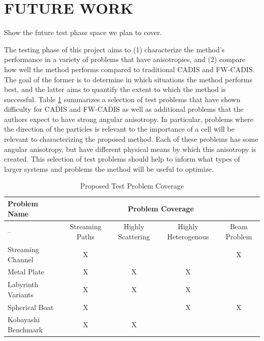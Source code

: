 \documentclass[12pt]{article}
\begin{document}
%
\section{FUTURE WORK} 
\label{sect::future}

Show the future test phase space we plan to cover. 

The testing phase of this project aims to (1) characterize the method's performance in a variety of problems that have anisotropies, and (2) compare how well the method performs compared to traditional CADIS and FW-CADIS.
The goal of the former is to determine in which situations the method performs best, and the latter aims to quantify the extent to which the method is successful. 
Table \ref{tab:testprobs} summarizes a selection of test problems that have shown difficulty for CADIS and FW-CADIS as well as additional problems that the authors expect to have strong angular anisotropy. 
In particular, problems where the direction of the particles is relevant to the importance of a cell will be relevant to characterizing the proposed method. 
Each of these problems has some angular anisotropy, but have different physical means by which this anisotropy is created. 
This selection of test problems should help to inform what types of larger systems and problems the method will be useful to optimize. 


 \begin{table}
  \centering
  \caption{Proposed Test Problem Coverage}
  \begin{tabular}{l|cccc}
    \toprule
    Problem Name & \multicolumn{4}{c}{Problem Coverage} \\
    \hline
    -- & Streaming Paths & Highly Scattering & Highly Heterogenous & Beam Problem \\
    \hline
    Streaming Channel   & X & & & X \\ 
    Metal Plate         & X & X & X &  \\
    Labyrinth Variants  & X & X & X &  \\ 
    Spherical Boat      & X & & X & X \\  
    Kobayashi Benchmark & X & X &  &  \\   
	\bottomrule
  \end{tabular}
  \label{tab:testprobs}
\end{table}
\end{document}
